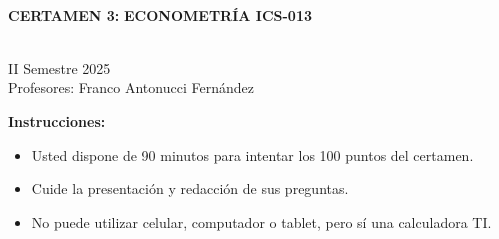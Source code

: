 \documentclass[10pt,a4paper]{article}
\begin{document}
\vspace{5cm}



\begin{center}
\begin{large}
\textbf{\\CERTAMEN 3:}\textbf{ ECONOMETRÍA ICS-013}
\end{large}\\
\vspace{0.2cm}
II Semestre 2025\\
Profesores: Franco Antonucci Fernández\\
\end{center}

\textbf{Instrucciones:} 

\begin{itemize}

    \item Usted dispone de 90 minutos  para intentar los 100 puntos del certamen.
    \item Cuide la presentación y redacción de sus preguntas.
    \item No puede utilizar celular, computador o tablet, pero sí una calculadora TI.
     
\end{itemize}
\end{document}

